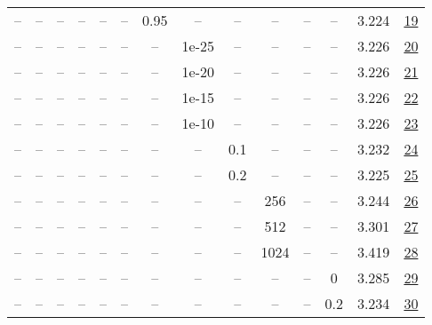\begin{table}[H]
\begin{tabular}{cccccccccccccc}
-- & -- & -- & -- & -- & -- & 0.95 & -- & -- & -- & -- & -- & 3.224 & \href{https://wandb.ai/stanford-mercury/optimizer-scaling/runs/sweep-300m-6B-muonf6219clr0.008-wd0.1-minlr0-warmup0-b10.8-b20.9-370a77}{19} \\
-- & -- & -- & -- & -- & -- & -- & 1e-25 & -- & -- & -- & -- & 3.226 & \href{https://wandb.ai/stanford-mercury/optimizer-scaling/runs/sweep-300m-6B-muonac34c0lr0.008-wd0.1-minlr0-warmup0-b10.8-b20.9-467678}{20} \\
-- & -- & -- & -- & -- & -- & -- & 1e-20 & -- & -- & -- & -- & 3.226 & \href{https://wandb.ai/stanford-mercury/optimizer-scaling/runs/sweep-300m-6B-muonbbf41alr0.008-wd0.1-minlr0-warmup0-b10.8-b20.9-bafb4a}{21} \\
-- & -- & -- & -- & -- & -- & -- & 1e-15 & -- & -- & -- & -- & 3.226 & \href{https://wandb.ai/stanford-mercury/optimizer-scaling/runs/sweep-300m-6B-muon443e3alr0.008-wd0.1-minlr0-warmup0-b10.8-b20.9-e4049e}{22} \\
-- & -- & -- & -- & -- & -- & -- & 1e-10 & -- & -- & -- & -- & 3.226 & \href{https://wandb.ai/stanford-mercury/optimizer-scaling/runs/sweep-300m-6B-muon369269lr0.008-wd0.1-minlr0-warmup0-b10.8-b20.9-38146c}{23} \\
-- & -- & -- & -- & -- & -- & -- & -- & 0.1 & -- & -- & -- & 3.232 & \href{https://wandb.ai/stanford-mercury/optimizer-scaling/runs/sweep-300m-6B-muona697c4lr0.008-wd0.1-minlr0-warmup0-b10.8-b20.9-58f541}{24} \\
-- & -- & -- & -- & -- & -- & -- & -- & 0.2 & -- & -- & -- & 3.225 & \href{https://wandb.ai/stanford-mercury/optimizer-scaling/runs/sweep-300m-6B-muon801ddclr0.008-wd0.1-minlr0-warmup0-b10.8-b20.9-551f94}{25} \\
-- & -- & -- & -- & -- & -- & -- & -- & -- & 256 & -- & -- & 3.244 & \href{https://wandb.ai/stanford-mercury/optimizer-scaling/runs/sweep-300m-6B-muon4f0758lr0.008-wd0.1-minlr0-warmup0-b10.8-b20.9-e54e80}{26} \\
-- & -- & -- & -- & -- & -- & -- & -- & -- & 512 & -- & -- & 3.301 & \href{https://wandb.ai/stanford-mercury/optimizer-scaling/runs/sweep-300m-6B-muon3e237dlr0.008-wd0.1-minlr0-warmup0-b10.8-b20.9-27901a}{27} \\
-- & -- & -- & -- & -- & -- & -- & -- & -- & 1024 & -- & -- & 3.419 & \href{https://wandb.ai/stanford-mercury/optimizer-scaling/runs/sweep-300m-6B-muon40d536lr0.008-wd0.1-minlr0-warmup0-b10.8-b20.9-f7b0ee}{28} \\
-- & -- & -- & -- & -- & -- & -- & -- & -- & -- & -- & 0 & 3.285 & \href{https://wandb.ai/stanford-mercury/optimizer-scaling/runs/sweep-300m-6B-muonabb96blr0.008-wd0-minlr0-warmup0-b10.8-b20.98--2f3d20}{29} \\
-- & -- & -- & -- & -- & -- & -- & -- & -- & -- & -- & 0.2 & 3.234 & \href{https://wandb.ai/stanford-mercury/optimizer-scaling/runs/sweep-300m-6B-muon174a96lr0.008-wd0.2-minlr0-warmup0-b10.8-b20.9-d21c0b}{30} \\
\bottomrule
\end{tabular}
\end{table}

